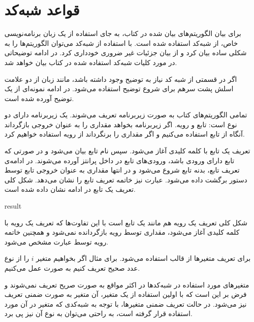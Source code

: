 \section*{قواعد شبه‌کد}

برای بیان الگوریتم‌های بیان شده در کتاب، به جای استفاده از یک زبان برنامه‌نویسی خاص، از شبه‌کد استفاده شده است. با استفاده از شبه‌کد می‌توان الگوریتم‌ها را به شکلی ساده بیان کرد و از بیان جزئیات غیر ضروری خودداری کرد. در ادامه توضیحاتی در مورد کلیات شبه‌کد استفاده شده در کتاب بیان خواهد شد.

اگر در قسمتی از شبه کد نیاز به توضیح وجود داشته باشد، مانند زبان {} از دو علامت اسلش پشت سرهم برای شروع توضیح استفاده می‌شود. در ادامه نمونه‌ای از یک توضیح آورده شده است.
\begin{latin}
\end{latin}

تمامی الگوریتم‌های کتاب به صورت زیربرنامه تعریف می‌شوند. یک زیربرنامه دارای دو نوع است: تابع و رویه. اگر زیربرنامه بخواهد مقداری را به عنوان خروجی بازگرداند آنگاه از تابع استفاده می‌کنیم و اگر مقداری را برنگرداند از رویه استفاده خواهیم کرد. 

تعریف یک تابع با کلمه کلیدی {} آغاز می‌شود. سپس نام تابع بیان می‌شود و در صورتی که تابع دارای ورودی باشد، ورودی‌های تابع در داخل پرانتز آورده می‌شوند. در ادامه‌ی تعریف تابع، بدنه تابع شروع می‌شود و در انتها مقداری به عنوان خروجی تابع توسط دستور {} برگشت داده می‌شود. عبارت {} نیز خاتمه تعریف تابع را نشان می‌دهد. شکل کلی تعریف یک تابع در ادامه نشان داده شده است.
\begin{latin}
\begin{algorithmic}[1]
	\State	{}
	\State	\Return result
\EndFunction
\end{algorithmic}
\end{latin}
شکل کلی تعریف یک رویه هم مانند یک تابع است با این تفاوت‌ها که تعریف یک رویه با کلمه کلیدی {} آغاز می‌شود، مقداری توسط رویه بازگردانده نمی‌شود و همچنین خاتمه رویه توسط عبارت {} مشخص می‌شود.

برای تعریف متغیرها از قالب {} استفاده می‌شود. برای مثال اگر بخواهیم متغیر {$i$} را از نوع عدد صحیح تعریف کنیم به صورت {} عمل می‌کنیم.

متغیرهای مورد استفاده در شبه‌کد‌ها در اکثر مواقع به صورت صریح تعریف نمی‌شوند و فرض بر این است که با اولین استفاده از یک متغیر، آن متغیر به صورت ضمنی تعریف نیز می‌شود. در حالت تعریف ضمنی متغیرها، با توجه به شبه‌کدی که متغیر در آن مورد استفاده قرار گرفته است، به راحتی می‌توان به نوع آن نیز پی برد.

